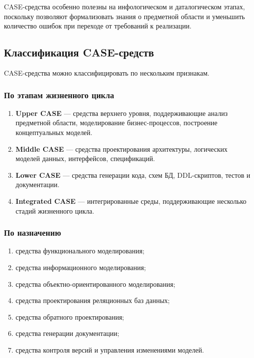 \documentclass[12pt,a4paper]{article}
\theoremstyle{remark}
\begin{document}
CASE-средства особенно полезны на инфологическом и даталогическом этапах, поскольку позволяют формализовать знания о предметной области и уменьшить количество ошибок при переходе от требований к реализации.

\subsection{Классификация CASE-средств}

CASE-средства можно классифицировать по нескольким признакам.

\subsubsection{По этапам жизненного цикла}

\begin{enumerate}
    \item \textbf{Upper CASE} --- средства верхнего уровня, поддерживающие анализ предметной области, моделирование бизнес-процессов, построение концептуальных моделей.
    \item \textbf{Middle CASE} --- средства проектирования архитектуры, логических моделей данных, интерфейсов, спецификаций.
    \item \textbf{Lower CASE} --- средства генерации кода, схем БД, DDL-скриптов, тестов и документации.
    \item \textbf{Integrated CASE} --- интегрированные среды, поддерживающие несколько стадий жизненного цикла.
\end{enumerate}

\subsubsection{По назначению}

\begin{enumerate}
    \item средства функционального моделирования;
    \item средства информационного моделирования;
    \item средства объектно-ориентированного моделирования;
    \item средства проектирования реляционных баз данных;
    \item средства обратного проектирования;
    \item средства генерации документации;
    \item средства контроля версий и управления изменениями моделей.
\end{enumerate}
\end{document}
